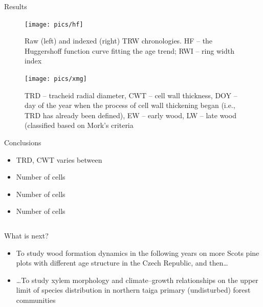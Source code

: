 \documentclass[final]{beamer}
\newlength{\sepwidth}
\newlength{\colwidth}
\newcommand{\separatorcolumn}{\begin{column}{\sepwidth}\end{column}}
\begin{document}
\begin{frame}[t]
\begin{columns}[t]
\begin{column}{\colwidth}
    \begin{block}{Results}
            \begin{figure}
                \centering \texttt{[image: pics/hf]}
                \caption{Raw (left) and indexed (right) TRW chronologies. HF -- the Huggershoff function curve fitting the age trend; RWI -- ring width index}
            \end{figure}
            \begin{figure}
                \centering \texttt{[image: pics/xmg]}
                \caption{TRD -- tracheid radial diameter, CWT -- cell wall thickness, DOY -- day of the year when the process of cell wall thickening began (i.e., TRD has already been defined), EW -- early wood, LW -- late wood (classified based on Mork's criteria}
            \end{figure}
    \end{block}

    \begin{block}{Conclusions}
        \begin{itemize}
            \item TRD, CWT varies between
            \item Number of cells
            \item Number of cells
            \item Number of cells
        \end{itemize}
    \end{block}

\end{column}
\end{columns}

\begin{columns}[c]
    \begin{column}{.95\paperwidth}
    \begin{block}{What is next?}
        \raggedleft
        \begin{itemize}
            \item To study wood formation dynamics in the following years on more Scots pine plots with different age structure in the Czech Republic, and then\dots
            \item {\dots}To study xylem morphology and climate--growth relationships on the upper limit of species distribution in northern taiga primary (undisturbed) forest communities 
        \end{itemize}
    \end{block}
\end{column}


\end{columns}
\end{frame}
\end{document}
